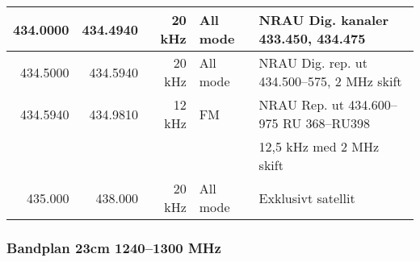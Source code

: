 \begin{tabular}{rrrll}
434.0000 & 434.4940 & 20 kHz  & All mode     & NRAU Dig. kanaler 433.450, 434.475                \\ \hline
434.5000 & 434.5940 & 20 kHz  & All mode     & NRAU Dig. rep. ut 434.500--575, 2 MHz skift       \\ \hline
434.5940 & 434.9810 & 12 kHz  & FM           & NRAU Rep. ut 434.600--975 RU 368--RU398           \\
         &          &         &              & 12,5 kHz med 2 MHz skift                          \\ \hline
435.000  & 438.000  & 20 kHz  & All mode     & Exklusivt satellit\\
\end{tabular}

\subsubsection{Bandplan 23cm 1240--1300 MHz}
